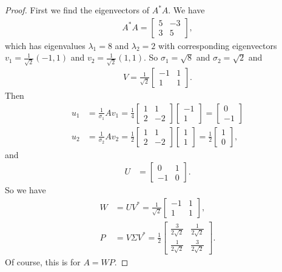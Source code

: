 \documentclass[leqno]{article}
\theoremstyle{nonumberplain}
\newtheorem{proof}{Proof}
\begin{document}
\begin{proof}
First we find the eigenvectors of $A^*A$. We have
\begin{align*}
A^*A= \begin{bmatrix}
5 & -3\\
3 & 5
\end{bmatrix},
\end{align*}
which has eigenvalues $\lambda_1=8$ and $\lambda_2=2$ with corresponding eigenvectors $v_1=\frac{1}{\sqrt{2}}(-1,1)$ and $v_2=\frac{1}{\sqrt{2}}(1,1)$. So $\sigma_1=\sqrt{8}$ and $\sigma_2=\sqrt{2}$ and
\begin{align*}
V=\frac{1}{\sqrt{2}}\begin{bmatrix}
-1 & 1\\
1 & 1
\end{bmatrix}.
\end{align*}
Then 
\begin{align*}
u_1&= \frac{1}{\sigma_1} A v_1 = \frac{1}{4}\begin{bmatrix}
1 & 1\\
2 & -2
\end{bmatrix}
\begin{bmatrix}
-1\\
1
\end{bmatrix}=
\begin{bmatrix}
0\\
-1
\end{bmatrix}\\
u_2&= \frac{1}{\sigma_2} A v_2 = \frac{1}{2}\begin{bmatrix}
1 & 1\\
2 & -2
\end{bmatrix}
\begin{bmatrix}
1\\
1
\end{bmatrix}=
\frac{1}{2}
\begin{bmatrix}
1\\
0
\end{bmatrix},
\end{align*}
and 
\begin{align*}
U&=\begin{bmatrix}
0 & 1\\
-1 & 0
\end{bmatrix}.
\end{align*}
So we have
\begin{align*}
W&=UV^* =\frac{1}{\sqrt{2}}\begin{bmatrix}
-1 & 1\\
1 & 1
\end{bmatrix},\\
P&=V\Sigma V^* = \frac{1}{2}
\begin{bmatrix}
\frac{3}{2\sqrt{2}} & \frac{1}{2\sqrt{2}}\\
\frac{1}{2\sqrt{2}} & \frac{3}{2\sqrt{2}}
\end{bmatrix}.
\end{align*}
Of course, this is for $A=WP$.
\end{proof}

\pagebreak
\end{document}
